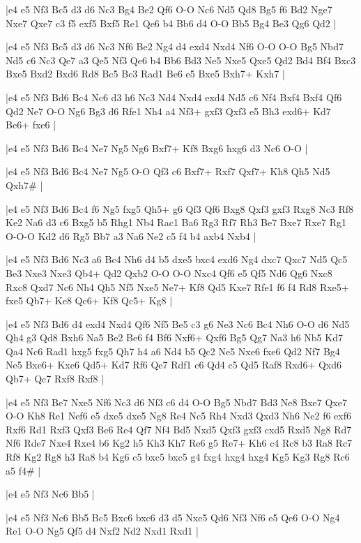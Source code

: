 \whitename{}
\blackname{}
\makegametitle
|e4 e5 Nf3 Bc5 d3 d6 Nc3 Bg4 Be2 Qf6 O-O Nc6 Nd5 Qd8 Bg5 f6 Bd2 Nge7 Nxe7 Qxe7 c3 f5 exf5 Bxf5 Re1 Qe6 b4 Bb6 d4 O-O Bb5 Bg4 Be3 Qg6 Qd2  |

\whitename{}
\blackname{}
\makegametitle
|e4 e5 Nf3 Bc5 d3 d6 Nc3 Nf6 Be2 Ng4 d4 exd4 Nxd4 Nf6 O-O O-O Bg5 Nbd7 Nd5 c6 Nc3 Qe7 a3 Qe5 Nf3 Qe6 b4 Bb6 Bd3 Ne5 Nxe5 Qxe5 Qd2 Bd4 Bf4 Bxc3 Bxe5 Bxd2 Bxd6 Rd8 Bc5 Bc3 Rad1 Be6 e5 Bxe5 Bxh7+ Kxh7  |

\whitename{}
\blackname{}
\makegametitle
|e4 e5 Nf3 Bd6 Bc4 Nc6 d3 h6 Nc3 Nd4 Nxd4 exd4 Nd5 c6 Nf4 Bxf4 Bxf4 Qf6 Qd2 Ne7 O-O Ng6 Bg3 d6 Rfe1 Nh4 a4 Nf3+ gxf3 Qxf3 e5 Bh3 exd6+ Kd7 Be6+ fxe6  |

\whitename{}
\blackname{}
\makegametitle
|e4 e5 Nf3 Bd6 Bc4 Ne7 Ng5 Ng6 Bxf7+ Kf8 Bxg6 hxg6 d3 Nc6 O-O  |

\whitename{}
\blackname{}
\makegametitle
|e4 e5 Nf3 Bd6 Bc4 Ne7 Ng5 O-O Qf3 c6 Bxf7+ Rxf7 Qxf7+ Kh8 Qh5 Nd5 Qxh7\#  |

\whitename{}
\blackname{}
\makegametitle
|e4 e5 Nf3 Bd6 Bc4 f6 Ng5 fxg5 Qh5+ g6 Qf3 Qf6 Bxg8 Qxf3 gxf3 Rxg8 Nc3 Rf8 Ke2 Na6 d3 c6 Bxg5 b5 Rhg1 Nb4 Rac1 Ba6 Rg3 Rf7 Rh3 Be7 Bxe7 Rxe7 Rg1 O-O-O Kd2 d6 Rg5 Bb7 a3 Na6 Ne2 c5 f4 b4 axb4 Nxb4  |

\whitename{}
\blackname{}
\makegametitle
|e4 e5 Nf3 Bd6 Nc3 a6 Bc4 Nh6 d4 b5 dxe5 bxc4 exd6 Ng4 dxc7 Qxc7 Nd5 Qc5 Be3 Nxe3 Nxe3 Qb4+ Qd2 Qxb2 O-O O-O Nxc4 Qf6 e5 Qf5 Nd6 Qg6 Nxc8 Rxc8 Qxd7 Nc6 Nh4 Qh5 Nf5 Nxe5 Ne7+ Kf8 Qd5 Kxe7 Rfe1 f6 f4 Rd8 Rxe5+ fxe5 Qb7+ Ke8 Qc6+ Kf8 Qc5+ Kg8  |

\whitename{}
\blackname{}
\makegametitle
|e4 e5 Nf3 Bd6 d4 exd4 Nxd4 Qf6 Nf5 Be5 c3 g6 Ne3 Nc6 Bc4 Nh6 O-O d6 Nd5 Qh4 g3 Qd8 Bxh6 Na5 Be2 Be6 f4 Bf6 Nxf6+ Qxf6 Bg5 Qg7 Na3 h6 Nb5 Kd7 Qa4 Nc6 Rad1 hxg5 fxg5 Qh7 h4 a6 Nd4 b5 Qc2 Ne5 Nxe6 fxe6 Qd2 Nf7 Bg4 Ne5 Bxe6+ Kxe6 Qd5+ Kd7 Rf6 Qe7 Rdf1 c6 Qd4 c5 Qd5 Raf8 Rxd6+ Qxd6 Qb7+ Qc7 Rxf8 Rxf8  |

\whitename{}
\blackname{}
\makegametitle
|e4 e5 Nf3 Be7 Nxe5 Nf6 Nc3 d6 Nf3 c6 d4 O-O Bg5 Nbd7 Bd3 Ne8 Bxe7 Qxe7 O-O Kh8 Re1 Nef6 e5 dxe5 dxe5 Ng8 Re4 Nc5 Rh4 Nxd3 Qxd3 Nh6 Ne2 f6 exf6 Rxf6 Rd1 Rxf3 Qxf3 Be6 Re4 Qf7 Nf4 Bd5 Nxd5 Qxf3 gxf3 cxd5 Rxd5 Ng8 Rd7 Nf6 Rde7 Nxe4 Rxe4 b6 Kg2 h5 Kh3 Kh7 Re6 g5 Re7+ Kh6 c4 Rc8 b3 Ra8 Rc7 Rf8 Kg2 Rg8 h3 Ra8 b4 Kg6 c5 bxc5 bxc5 g4 fxg4 hxg4 hxg4 Kg5 Kg3 Rg8 Rc6 a5 f4\#  |

\whitename{}
\blackname{}
\makegametitle
|e4 e5 Nf3 Nc6 Bb5  |

\whitename{}
\blackname{}
\makegametitle
|e4 e5 Nf3 Nc6 Bb5 Bc5 Bxc6 bxc6 d3 d5 Nxe5 Qd6 Nf3 Nf6 e5 Qe6 O-O Ng4 Re1 O-O Ng5 Qf5 d4 Nxf2 Nd2 Nxd1 Rxd1  |

